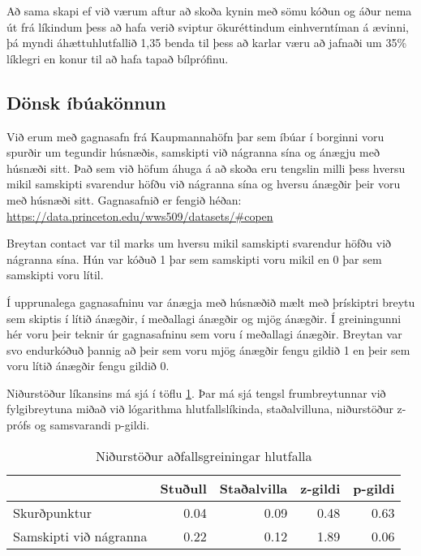 \documentclass[]{book}
\begin{document}
Að sama skapi ef við værum aftur að skoða kynin með sömu kóðun og áður nema út frá líkindum þess að hafa verið sviptur ökuréttindum einhverntíman á ævinni, þá myndi áhættuhlutfallið 1,35 benda til þess að karlar væru að jafnaði um 35\% líklegri en konur til að hafa tapað bílprófinu.

\hypertarget{duxf6nsk-uxedbuxfaakuxf6nnun}{%
\subsection{Dönsk íbúakönnun}\label{duxf6nsk-uxedbuxfaakuxf6nnun}}

Við erum með gagnasafn frá Kaupmannahöfn þar sem íbúar í borginni voru spurðir um tegundir húsnæðis, samskipti við nágranna sína og ánægju með húsnæði sitt. Það sem við höfum áhuga á að skoða eru tengslin milli þess hversu mikil samskipti svarendur höfðu við nágranna sína og hversu ánægðir þeir voru með húsnæði sitt. Gagnasafnið er fengið héðan: \url{https://data.princeton.edu/wws509/datasets/\#copen}

Breytan contact var til marks um hversu mikil samskipti svarendur höfðu við nágranna sína. Hún var kóðuð 1 þar sem samskipti voru mikil en 0 þar sem samskipti voru lítil.

Í upprunalega gagnasafninu var ánægja með húsnæðið mælt með þrískiptri breytu sem skiptis í lítið ánægðir, í meðallagi ánægðir og mjög ánægðir. Í greiningunni hér voru þeir teknir úr gagnasafninu sem voru í meðallagi ánægðir. Breytan var svo endurkóðuð þannig að þeir sem voru mjög ánægðir fengu gildið 1 en þeir sem voru lítið ánægðir fengu gildið 0.

Niðurstöður líkansins má sjá í töflu \ref{tab:kobentafla}. Þar má sjá tengsl frumbreytunnar við fylgibreytuna miðað við lógarithma hlutfallslíkinda, staðalvilluna, niðurstöður z-prófs og samsvarandi p-gildi.

\begin{table}

\caption{\label{tab:kobentafla}Niðurstöður aðfallsgreiningar hlutfalla}
\centering
\begin{tabular}[t]{l|r|r|r|r}
\hline
  & Stuðull & Staðalvilla & z-gildi & p-gildi\\
\hline
Skurðpunktur & 0.04 & 0.09 & 0.48 & 0.63\\
\hline
Samskipti við nágranna & 0.22 & 0.12 & 1.89 & 0.06\\
\hline
\end{tabular}
\end{table}
\end{document}

